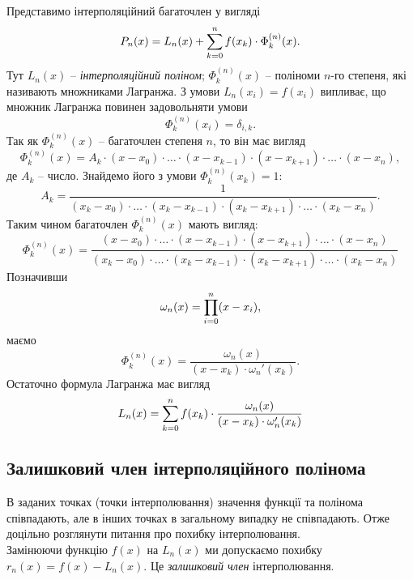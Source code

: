 Представимо інтерполяційний багаточлен у вигляді \begin{equation} \label{eq:6.3} P_n(x) = L_n(x) + \displaystyle\sum\limits_{k=0}^n f(x_k)\cdot\Phi_k^{(n)}(x). \end{equation} Тут $L_n(x)$ -- \textit{інтерполяційний поліном}; $\Phi_k^{(n)}(x)$ -- поліноми $n$-го степеня, які називають множниками Лагранжа. З умови $L_n(x_i)=f(x_i)$ випливає, що множник Лагранжа повинен задовольняти умови \begin{equation} \label{eq:6.4} \Phi_k^{(n)} (x_i) = \delta_{i,k}. \end{equation} Так як $\Phi_k^{(n)}(x)$ -- багаточлен степеня $n$, то він має вигляд \[ \Phi_k^{(n)}(x) = A_k\cdot(x-x_0)\cdot\ldots\cdot(x-x_{k-1})\cdot(x-x_{k+1})\cdot\ldots\cdot(x-x_n), \] де $A_k$ -- число. Знайдемо його з умови $\Phi_k^{(n)}(x_k) = 1$: \[ A_k = \dfrac{1}{(x_k-x_0)\cdot\ldots\cdot(x_k-x_{k-1})\cdot(x_k-x_{k+1})\cdot\ldots\cdot(x_k-x_n)}. \] Таким чином багаточлен $\Phi_k^{(n)}(x)$ мають вигляд: \begin{equation} \label{eq:6.5} \Phi_k^{(n)} (x) = \dfrac{(x-x_0)\cdot\ldots\cdot(x-x_{k-1})\cdot(x-x_{k+1})\cdot\ldots\cdot(x-x_n)}{(x_k-x_0)\cdot\ldots\cdot(x_k-x_{k-1})\cdot(x_k-x_{k+1})\cdot\ldots\cdot(x_k-x_n)} \end{equation} Позначивши \[\omega_n(x) = \displaystyle\prod\limits_{i=0}^n(x-x_i),\] маємо \[\Phi_k^{(n)}(x) = \dfrac{\omega_n(x)}{(x-x_k)\cdot\omega_n'(x_k)}.\] Остаточно формула Лагранжа має вигляд \begin{equation} \label{eq:6.6} L_n(x) = \displaystyle\sum\limits_{k=0}^n f(x_k)\cdot\dfrac{\omega_n(x)}{(x-x_k)\cdot\omega_n'(x_k)} \end{equation}
\subsection{Залишковий член інтерполяційного полінома}
В заданих точках (точки інтерполювання) значення функції та полінома співпадають, але в інших точках в загальному випадку не співпадають. Отже доцільно розглянути питання про похибку інтерполювання. \\

Замінюючи функцію $f(x)$ на $L_n(x)$ ми допускаємо похибку $r_n(x)=f(x)-L_n(x)$. Це \textit{залишковий член} інтерполювання. \\

